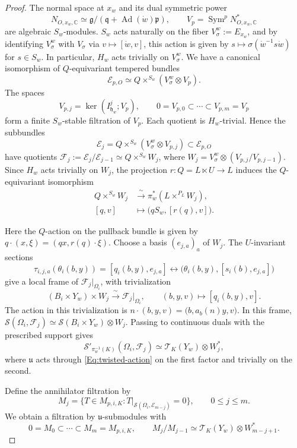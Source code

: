 \documentclass[a4paper,12pt]{amsart}
\numberwithin{equation}{section}
\theoremstyle{plain}
\theoremstyle{definition}
\theoremstyle{remark}
\begin{document}
\begin{proof}
The normal space at $x_w$ and its dual symmetric power
\[
 N_{O,x_w,\mathbb C}\simeq
 \mathfrak g/(\mathfrak q+\operatorname{Ad}(\dot w)\mathfrak p),
 \qquad V_p=\operatorname{Sym}^pN_{O,x_w,\mathbb C}^*
\]
are algebraic $S_w$-modules.
$S_w$ acts naturally on the fiber $V_\sigma^w:=E_{x_w}$, and by identifying $V_\sigma^w$ with $V_\sigma$ via $v\mapsto[\dot w,v]$, this action is given by $s\mapsto\sigma(\dot w^{-1}s\dot w)$ for $s\in S_w$.
In particular, $H_w$ acts trivially on $V_\sigma^w$.
We have a canonical isomorphism of $Q$-equivariant tempered bundles
\[
 \mathcal E_{p,O}\simeq Q\times^{S_w}(V_\sigma^w\otimes V_p).
\]
The spaces
\[
 V_{p,j}=\ker(I_{\mathfrak h_w}^{j};V_p),\qquad
 0=V_{p,0}\subset\cdots\subset V_{p,m}=V_p
\]
form a finite $S_w$-stable filtration of $V_p$.
Each quotient is $H_w$-trivial.
Hence the subbundles
\[
 \mathcal E_j=Q\times^{S_w}(V_\sigma^w\otimes V_{p,j})
 \subset\mathcal E_{p,O}
\]
have quotients $\mathcal F_j:=\mathcal E_j/\mathcal E_{j-1}\simeq Q\times^{S_w}W_j$, where $W_j=V_\sigma^w\otimes(V_{p,j}/V_{p,j-1})$.
Since $H_w$ acts trivially on $W_j$, the projection $r:Q=L\ltimes U\to L$ induces the $Q$-equivariant isomorphism
\[
\begin{aligned}
 Q\times^{S_w}W_j&\xrightarrow{\ \sim\ }\pi_w^*(L\times^{P_L}W_j),\\
 [q,v]&\longmapsto\bigl(qS_w,[r(q),v]\bigr).
\end{aligned}
\]

Here the $Q$-action on the pullback bundle is given by $q\cdot(x,\xi)=(qx,r(q)\cdot\xi)$.
Choose a basis $(e_{j,a})_a$ of $W_j$.
The $U$-invariant sections
\[
 \tau_{i,j,a}(\theta_i(b,y))=[q_i(b,y),e_{j,a}]
 \longleftrightarrow\bigl(\theta_i(b,y),[s_i(b),e_{j,a}]\bigr)
\]
give a local frame of $\mathcal F_j|_{\Omega_i}$, with trivialization
\[
 (B_i\times Y_w)\times W_j\xrightarrow{\ \sim\ }\mathcal F_j|_{\Omega_i},
 \qquad (b,y,v)\longmapsto[q_i(b,y),v].
\]
The action in this trivialization is $n\cdot(b,y,v)=\bigl(b,a_b(n)y,v\bigr)$.
In this frame, $\mathcal S(\Omega_i,\mathcal F_j)\simeq\mathcal S(B_i\times Y_w)\otimes W_j$.
Passing to continuous duals with the prescribed support gives
\[
 \mathcal S'_{\pi_w^{-1}(K)}(\Omega_i,\mathcal F_j)
 \simeq\mathcal T_K(Y_w)\otimes W_j^*,
\]
where $\mathfrak u$ acts through \eqref{Eq:twisted-action} on the first factor and trivially on the second.

Define the annihilator filtration by
\[
 M_j=\{T\in M_{p,i,K}:
       T|_{\mathcal S(\Omega_i,\mathcal E_{m-j})}=0\},
 \qquad 0\leq j\leq m.
\]
We obtain a filtration by $\mathfrak u$-submodules with
\[
 0=M_0\subset\cdots\subset M_m=M_{p,i,K},\qquad
 M_j/M_{j-1}\simeq\mathcal T_K(Y_w)\otimes W_{m-j+1}^*.
\]
\end{proof}
\end{document}
